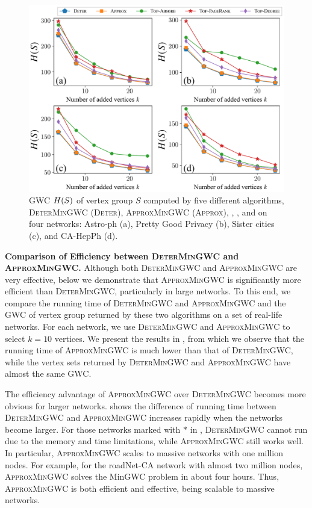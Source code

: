 \documentclass[10pt,twocolumn,twoside]{IEEEtran}
\begin{document}
\begin{figure}[!t]
    \centering
    \includegraphics[width=\linewidth]{compare_effects_exact2.pdf}
    \caption{GWC \(H(S)\) of vertex group \(S\) computed by five different algorithms, \textsc{DeterMinGWC} (\textsc{Deter}), \textsc{ApproxMinGWC} (\textsc{Approx}), ,  , and    on four networks: Astro-ph (a), Pretty Good Privacy (b), Sister cities (c), and CA-HepPh (d).\label{pic:compare-effect2}}
\end{figure}

\textbf{Comparison of Efficiency between \textsc{DeterMinGWC} and \textsc{ApproxMinGWC}.} Although both \textsc{DeterMinGWC} and \textsc{ApproxMinGWC} are very effective, below we demonstrate that \textsc{ApproxMinGWC} is significantly more efficient than \textsc{DeterMinGWC}, particularly in large networks. To this end, we compare the running time of \textsc{DeterMinGWC} and \textsc{ApproxMinGWC} and the GWC of vertex group returned by these two algorithms on a set of real-life networks. For each network, we use \textsc{DeterMinGWC} and \textsc{ApproxMinGWC} to select \(k=10\) vertices. We present the results in , from which we observe that the running time of  \textsc{ApproxMinGWC} is much lower than  that of \textsc{DeterMinGWC}, while the vertex sets returned by  \textsc{DeterMinGWC} and \textsc{ApproxMinGWC} have almost the same GWC.

The efficiency advantage of   \textsc{ApproxMinGWC} over  \textsc{DeterMinGWC} becomes more obvious for larger networks.  shows the difference of running time between   \textsc{DeterMinGWC} and \textsc{ApproxMinGWC} increases rapidly when the networks become larger. For those networks marked with \(\ast\) in ,  \textsc{DeterMinGWC} cannot run due to the memory and time limitations, while  \textsc{ApproxMinGWC} still works well. In particular, \textsc{ApproxMinGWC} scales to massive networks with one million nodes. For example, for the roadNet-CA network with almost two million nodes, \textsc{ApproxMinGWC} solves the MinGWC problem in about four hours. Thus, \textsc{ApproxMinGWC} is both efficient and effective, being scalable to massive networks.
\end{document}
